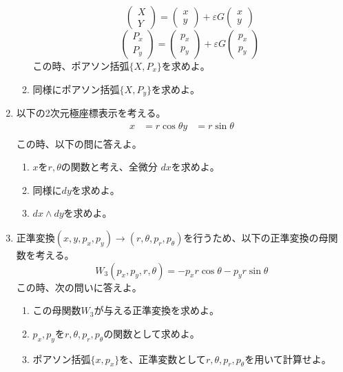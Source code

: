 \documentclass{jsarticle}
\begin{document}
\begin{enumerate}
\begin{enumerate}
                $$
                  \begin{pmatrix}
                    X \\ Y
                  \end{pmatrix}
                  =
                  \begin{pmatrix}
                    x \\ y
                  \end{pmatrix}
                  + \varepsilon G
                  \begin{pmatrix}
                    x \\ y
                  \end{pmatrix}
                $$
                $$
                  \begin{pmatrix}
                    P_x \\ P_y
                  \end{pmatrix}
                  =
                  \begin{pmatrix}
                    p_x \\ p_y
                  \end{pmatrix}
                  + \varepsilon G
                  \begin{pmatrix}
                    p_x \\ p_y
                  \end{pmatrix}
                $$
                この時、ポアソン括弧$\{X, P_x\}$を求めよ。
          \item 同様にポアソン括弧$\{X, P_y\}$を求めよ。
        \end{enumerate}
        \newpage
  \item 以下の2次元極座標表示を考える。
        $$
          \begin{aligned}
            x & = r \cos \theta
            y & = r \sin \theta \\
          \end{aligned}
        $$
        この時、以下の問に答えよ。
        \begin{enumerate}
          \item $x$を$r, \theta$の関数と考え、全微分 $dx$を求めよ。
          \item 同様に$dy$を求めよ。
          \item $dx \wedge dy$を求めよ。
        \end{enumerate}
  \item 正準変換$(x, y, p_x, p_y) \rightarrow (r, \theta, p_r, p_\theta)$を行うため、以下の正準変換の母関数を考える。
        $$
          W_3(p_x, p_y, r, \theta) = - p_x r \cos \theta - p_y r \sin \theta
        $$
        この時、次の問いに答えよ。
        \begin{enumerate}
          \item この母関数$W_3$が与える正準変換を求めよ。
          \item $p_x, p_y$を$r, \theta, p_r, p_\theta$の関数として求めよ。
          \item ポアソン括弧$\{x, p_x\}$を、正準変数として$r, \theta, p_r, p_\theta$を用いて計算せよ。
        \end{enumerate}
\end{enumerate}
\end{document}
